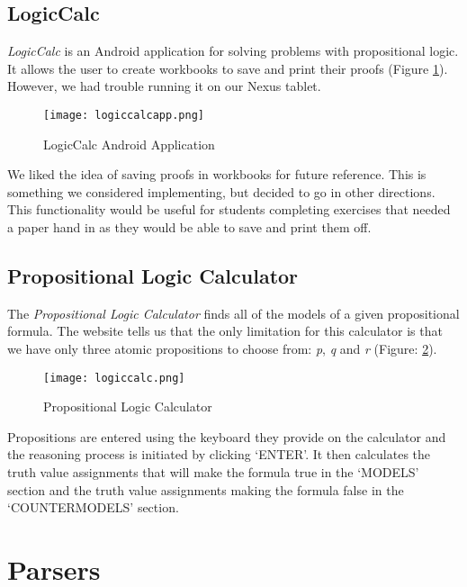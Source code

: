 \documentclass[draft]{report}
\begin{document}
\subsection{LogicCalc}

\emph{LogicCalc} is an Android application for solving problems with propositional logic. It allows the user to create workbooks to save and print their proofs (Figure \ref{logiccalcapp}). However, we had trouble running it on our Nexus tablet.

\begin{figure}[ht!]
    \centering
    \texttt{[image: logiccalcapp.png]}
    \caption{LogicCalc Android Application}
    \label{logiccalcapp}
\end{figure}

We liked the idea of saving proofs in workbooks for future reference. This is something we considered implementing, but decided to go in other directions. This functionality would be useful for students completing exercises that needed a paper hand in as they would be able to save and print them off.

\subsection{Propositional Logic Calculator}

The \emph{Propositional Logic Calculator}\cite{logiccalc} finds all of the models of a given propositional formula. The website tells us that the only limitation for this calculator is that we have only three atomic propositions to choose from: \emph{p}, \emph{q} and \emph{r} (Figure: \ref{logiccalc}).

\begin{figure}[ht!]
    \centering
    \texttt{[image: logiccalc.png]}
    \caption{Propositional Logic Calculator}
    \label{logiccalc}
\end{figure}

Propositions are entered using the keyboard they provide on the calculator and the reasoning process is initiated by clicking `ENTER'. It then calculates the truth value assignments that will make the formula true in the `MODELS' section and the truth value assignments making the formula false in the `COUNTERMODELS' section.

\FloatBarrier
\section{Parsers}
\end{document}
